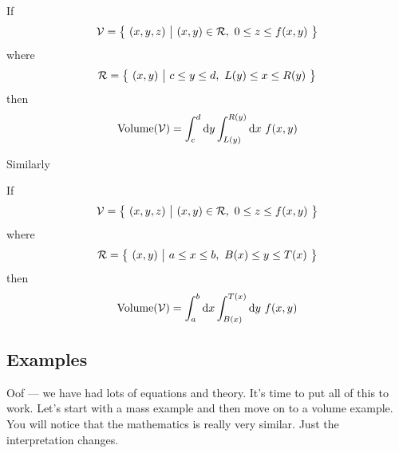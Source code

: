 \begin{impeqn}\label{eqn Volume y slice}
If 
\begin{equation*}
\cV = \big\{\ (x,y,z)\ \big|\ (x,y)\in\cR,\  0\le z\le f(x,y)\ \big\}
\end{equation*}
where
\begin{equation*}
\mathcal{R} = \big\{\ (x,y)\ \big|\ c\le y\le d,\ L(y)\le x\le R(y)\ \big\}
\end{equation*}
then
\begin{equation*}
    \text{Volume}(\mathcal{V})
        =\int_c^d \mathrm{d}y\int_{L(y)}^{R(y)} \mathrm{d}x\ f(x,y)
\end{equation*}
\end{impeqn}
Similarly
 \begin{impeqn}\label{eqn Volume x slice}
If 
\begin{equation*}
\cV = \big\{\ (x,y,z)\ \big|\ (x,y)\in\cR,\  0\le z\le f(x,y)\ \big\}
\end{equation*}
where
\begin{equation*}
\mathcal{R} = \big\{\ (x,y)\ \big|\ a\le x\le b,\ B(x)\le y\le T(x)\ \big\}
\end{equation*}
then
\begin{equation*}
    \text{Volume}(\mathcal{V})
        =\int_a^b \mathrm{d}x\int_{B(x)}^{T(x)} \mathrm{d}y\ f(x,y)
\end{equation*}
\end{impeqn}


\goodbreak
\subsection{Examples}
\label{sec int examples}

Oof --- we have had lots of equations and theory. It's time to put
all of this to work. Let's start with a mass example and then move on to 
a volume example. You will notice that the mathematics is really very
similar. Just the interpretation changes. 


